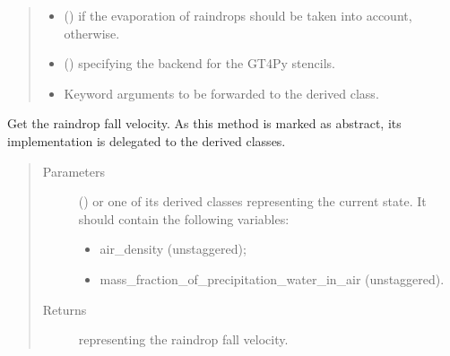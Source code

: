 \documentclass[letterpaper,10pt,english]{sphinxmanual}
\begin{document}
\begin{fulllineitems}
\begin{fulllineitems}
\begin{quote}
\begin{description}
\begin{itemize}
\item {} 
 () \textendash{}  if the evaporation of raindrops should be taken into account,  otherwise.

\item {} 
 () \textendash{}  specifying the backend for the GT4Py stencils.

\item {} 
 \textendash{} Keyword arguments to be forwarded to the derived class.

\end{itemize}

\end{description}\end{quote}

\end{fulllineitems}


\begin{fulllineitems}
\label{\detokenize{api:tasmania.parameterizations.adjustments.AdjustmentMicrophysics.get_raindrop_fall_velocity}}
Get the raindrop fall velocity.
As this method is marked as abstract, its implementation is delegated to the derived classes.
\begin{quote}\begin{description}
\item[{Parameters}] \leavevmode
{} () \textendash{} 
{\hyperref[\detokenize{api:tasmania.storages.grid_data.GridData}]{}} or one of its derived classes representing the current state.
It should contain the following variables:
\begin{itemize}
\item {} 
air\_density (unstaggered);

\item {} 
mass\_fraction\_of\_precipitation\_water\_in\_air (unstaggered).

\end{itemize}


\item[{Returns}] \leavevmode
{} representing the raindrop fall velocity.


\end{description}
\end{quote}
\end{fulllineitems}
\end{fulllineitems}
\end{document}
